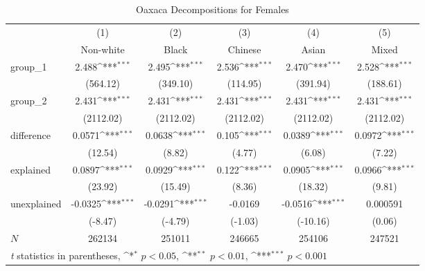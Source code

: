 \begin{table}[htbp]\centering
\def\sym#1{\ifmmode^{#1}\else\(^{#1}\)\fi}
\caption{Oaxaca Decompositions for Females\label{tab1}}
\begin{tabular}{l*{5}{c}}
\hline\hline
            &\multicolumn{1}{c}{(1)}&\multicolumn{1}{c}{(2)}&\multicolumn{1}{c}{(3)}&\multicolumn{1}{c}{(4)}&\multicolumn{1}{c}{(5)}\\
            &\multicolumn{1}{c}{Non-white}&\multicolumn{1}{c}{Black}&\multicolumn{1}{c}{Chinese}&\multicolumn{1}{c}{Asian}&\multicolumn{1}{c}{Mixed}\\
\hline
group\_1     &       2.488\sym{***}&       2.495\sym{***}&       2.536\sym{***}&       2.470\sym{***}&       2.528\sym{***}\\
            &    (564.12)         &    (349.10)         &    (114.95)         &    (391.94)         &    (188.61)         \\
group\_2     &       2.431\sym{***}&       2.431\sym{***}&       2.431\sym{***}&       2.431\sym{***}&       2.431\sym{***}\\
            &   (2112.02)         &   (2112.02)         &   (2112.02)         &   (2112.02)         &   (2112.02)         \\
difference  &      0.0571\sym{***}&      0.0638\sym{***}&       0.105\sym{***}&      0.0389\sym{***}&      0.0972\sym{***}\\
            &     (12.54)         &      (8.82)         &      (4.77)         &      (6.08)         &      (7.22)         \\
explained   &      0.0897\sym{***}&      0.0929\sym{***}&       0.122\sym{***}&      0.0905\sym{***}&      0.0966\sym{***}\\
            &     (23.92)         &     (15.49)         &      (8.36)         &     (18.32)         &      (9.81)         \\
unexplained &     -0.0325\sym{***}&     -0.0291\sym{***}&     -0.0169         &     -0.0516\sym{***}&    0.000591         \\
            &     (-8.47)         &     (-4.79)         &     (-1.03)         &    (-10.16)         &      (0.06)         \\
\hline
\(N\)       &      262134         &      251011         &      246665         &      254106         &      247521         \\
\hline\hline
\multicolumn{6}{l}{\footnotesize \textit{t} statistics in parentheses, \sym{*} \(p<0.05\), \sym{**} \(p<0.01\), \sym{***} \(p<0.001\)}\\
\end{tabular}
\label{tab:oaxaca_female_summary}
\end{table}
